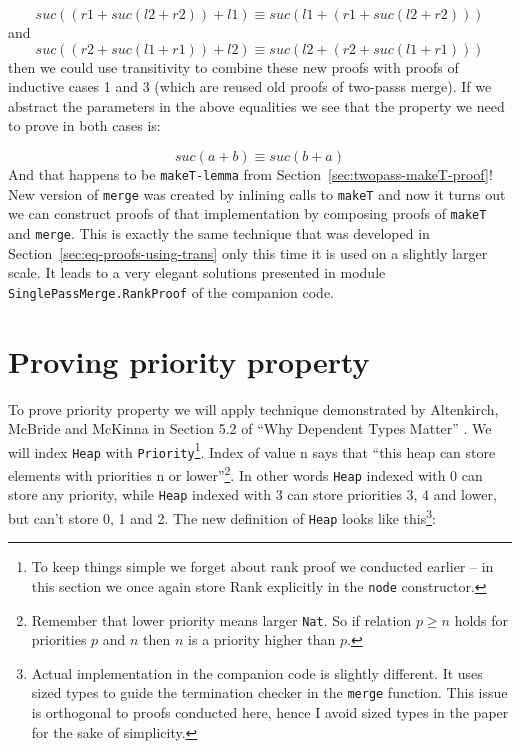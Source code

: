 \begin{equation*}
suc ((r1 + suc (l2 + r2)) + l1) ≡ suc (l1 + (r1 + suc (l2 + r2)))
\end{equation*}
\noindent
and
\begin{equation*}
suc ((r2 + suc (l1 + r1)) + l2) ≡ suc (l2 + (r2  + suc (l1 + r1)))
\end{equation*}
\noindent
then we could use transitivity to combine these new proofs with proofs of inductive cases 1 and 3 (which are reused old proofs of two-passs merge). If we abstract the parameters in the above equalities we see that the property we need to prove in both cases is:

\begin{equation*}
suc (a + b) ≡ suc (b + a)
\end{equation*}
\noindent
And that happens to be \texttt{makeT-lemma} from Section~\ref{sec:twopass-makeT-proof}! New version of \texttt{merge} was created by inlining calls to \texttt{makeT} and now it turns out we can construct proofs of that implementation by composing proofs of \texttt{makeT} and \texttt{merge}. This is exactly the same technique that was developed in Section~\ref{sec:eq-proofs-using-trans} only this time it is used on a slightly larger scale. It leads to a very elegant solutions presented in module \texttt{SinglePassMerge.}\texttt{RankProof} of the companion code.

\section[Proving priority property]{Proving priority property} \label{sec:priority-invariant}

To prove priority property we will apply technique demonstrated by Altenkirch, McBride and McKinna in Section 5.2 of ``Why Dependent Types Matter'' \cite{AltMcBMcK05}. We will index \texttt{Heap} with \texttt{Priority}\footnote{To keep things simple we forget about rank proof we conducted earlier -- in this section we once again store Rank explicitly in the \texttt{node} constructor.}. Index of value n says that ``this heap can store elements with priorities n or lower''\footnote{Remember that lower priority means larger \texttt{Nat}. So if relation $p ≥ n$ holds for priorities $p$ and $n$ then $n$ is a priority higher than $p$.}. In other words \texttt{Heap} indexed with 0 can store any priority, while \texttt{Heap} indexed with 3 can store priorities 3, 4 and lower, but can't store 0, 1 and 2. The new definition of \texttt{Heap} looks like this\footnote{Actual implementation in the companion code is slightly different. It uses sized types \cite{Abe08} to guide the termination checker in the \texttt{merge} function. This issue is orthogonal to proofs conducted here, hence I avoid sized types in the paper for the sake of simplicity.}:

